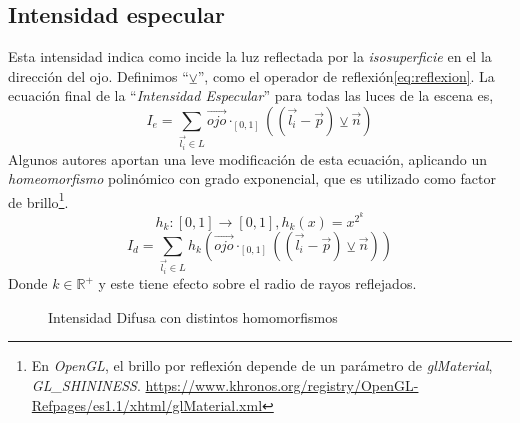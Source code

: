 \subsection{Intensidad especular}
Esta intensidad indica como incide la luz reflectada  por la \textit{isosuperficie} en el la dirección del ojo. Definimos \enquote{\(\veebar\)}, como el operador de reflexión\ref{eq:reflexion}. La ecuación final de la \enquote{\textit{Intensidad Especular}} para todas las luces de la escena es,
\[I_e = \sum_{\Vec{l_i}\in L} \Vec{ojo}\cdot_{[0, 1]}\left(\left(\Vec{l_i}-\Vec{p}\right) \veebar \Vec{n}\right)\]
Algunos autores aportan una leve modificación de esta ecuación, aplicando un \textit{homeomorfismo} polinómico con grado exponencial, que es utilizado como factor de brillo\footnote{En \textit{OpenGL}, el brillo por reflexión depende de un parámetro de  \textit{glMaterial}, \textit{GL\_SHININESS}. \url{https://www.khronos.org/registry/OpenGL-Refpages/es1.1/xhtml/glMaterial.xml}}.
\[h_k:[0,1]\longrightarrow[0,1] , h_k(x)=x^{2^k}\]
\[I_d = \sum_{\Vec{l_i}\in L} h_k\left(\Vec{ojo}\cdot_{[0, 1]}\left(\left(\Vec{l_i}-\Vec{p}\right) \veebar \Vec{n}\right)\right)\]
Donde \(k\in\mathbb{R}^{+}\) y este tiene efecto sobre el radio de rayos reflejados.
\begin{figure}[H]
  \centering
  \captionsetup{justification=centering}%
  \hfill
  \hfill
  \caption{Intensidad Difusa con distintos homomorfismos}
  \label{fig:specular}
\end{figure}
